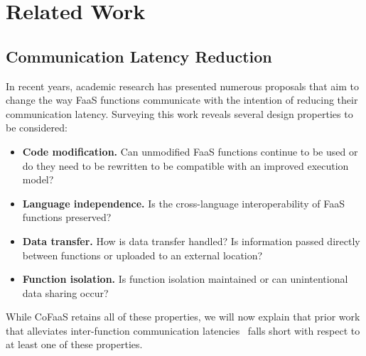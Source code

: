 \section{Related Work}
\label{es:sec:related-work}

\subsection{Communication Latency Reduction}

In recent years, academic research has presented numerous proposals that aim to change the way FaaS functions communicate with the intention of reducing their communication latency. Surveying this work reveals several design properties to be considered:
\begin{itemize}
\item {\bf Code modification.} Can unmodified FaaS functions continue to be used or do they need to be rewritten to be compatible with an improved execution model?
\item {\bf Language independence.} Is the cross-language interoperability of FaaS functions preserved?
\item {\bf Data transfer.} How is data transfer handled? Is information passed directly between functions or uploaded to an external location?
\item {\bf Function isolation.} Is function isolation maintained or can unintentional data sharing occur?
\end{itemize}
While CoFaaS retains all of these properties, we will now explain that prior work that alleviates inter-function communication latencies~\cite{kotni21_faast, mahgoub22_wisef, barcelona-pons19_faas_track,sreekanti20_cloud,shillaker20_faasm,jia21_night} falls short with respect to at least one of these properties. 



